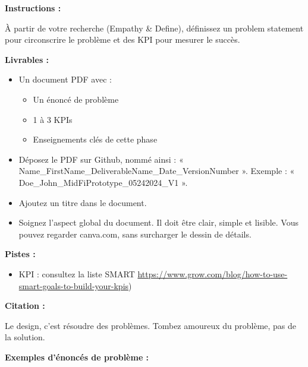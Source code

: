 \makeheaderfiles

\textbf{Instructions :}

À partir de votre recherche (Empathy \& Define), définissez un problem statement pour circonscrire le problème et des KPI pour mesurer le succès.

\textbf{Livrables :}

\begin{itemize}
\item Un document PDF avec :
\begin{itemize}
\item Un énoncé de problème
\item 1 à 3 KPIs
\item Enseignements clés de cette phase
\end{itemize}
\item Déposez le PDF sur Github, nommé ainsi : « Name\_FirstName\_DeliverableName\_Date\_VersionNumber ». Exemple : « Doe\_John\_MidFiPrototype\_05242024\_V1 ».
\item Ajoutez un titre dans le document.
\item Soignez l'aspect global du document. Il doit être clair, simple et lisible. Vous pouvez regarder canva.com, sans surcharger le dessin de détails.
\end{itemize}

\textbf{Pistes :}
\begin{itemize}
\item KPI : consultez la liste SMART \url{https://www.grow.com/blog/how-to-use-smart-goals-to-build-your-kpis})
\end{itemize}

\textbf{Citation :}

Le design, c'est résoudre des problèmes. Tombez amoureux du problème, pas de la solution.

\textbf{Exemples d'énoncés de problème :}

